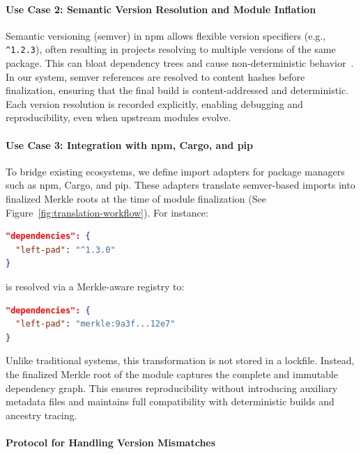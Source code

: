 \documentclass[sigplan,screen]{acmart}
\begin{document}
\paragraph{Use Case 2: Semantic Version Resolution and Module Inflation}

Semantic versioning (semver) in npm allows flexible version specifiers (e.g., \verb#^1.2.3#), often resulting in projects resolving to multiple versions of the same package. This can bloat dependency trees and cause non-deterministic behavior~\cite{pinckney2023largescale}. In our system, semver references are resolved to content hashes before finalization, ensuring that the final build is content-addressed and deterministic. Each version resolution is recorded explicitly, enabling debugging and reproducibility, even when upstream modules evolve.

\paragraph{Use Case 3: Integration with npm, Cargo, and pip}

To bridge existing ecosystems, we define import adapters for package managers such as npm, Cargo, and pip. These adapters translate semver-based imports into finalized Merkle roots at the time of module finalization (See Figure~\ref{fig:translation-workflow}). For instance:

\begin{lstlisting}[language=json,caption={npm-style import resolved to content hash},label={lst:npm-to-merkle}]
"dependencies": {
  "left-pad": "^1.3.0"
}
\end{lstlisting}

is resolved via a Merkle-aware registry to:

\begin{lstlisting}[language=json]
"dependencies": {
  "left-pad": "merkle:9a3f...12e7"
}
\end{lstlisting}

Unlike traditional systems, this transformation is not stored in a lockfile. Instead, the finalized Merkle root of the module captures the complete and immutable dependency graph. This ensures reproducibility without introducing auxiliary metadata files and maintains full compatibility with deterministic builds and ancestry tracing.

\paragraph{Protocol for Handling Version Mismatches}
\end{document}
